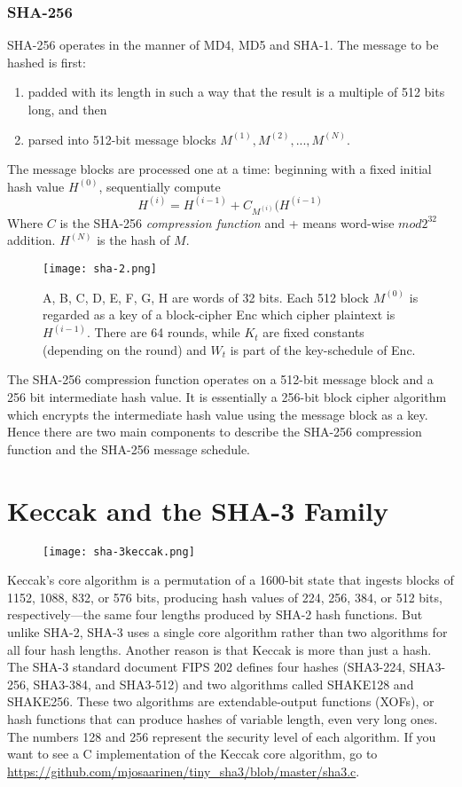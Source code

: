 \documentclass{article}
\begin{document}
\subsubsection{SHA-256}
\newline SHA-256 operates in the manner of MD4, MD5 and SHA-1. The message to be hashed is first:
\begin{enumerate}
    \item padded with its length in such a way that the result is a multiple of 512 bits long, and then
    \item parsed into 512-bit message blocks $M^{(1)}, M^{(2)}, ..., M^{(N)}$.
\end{enumerate}
The message blocks are processed one at a time: beginning with a fixed initial hash value $H^{(0)}$, sequentially compute
\begin{equation*}
    H^{(i)}=H^{(i-1)} + C_{M^{(i)}}(H^{(i-1)}
\end{equation*}
Where $C$ is the SHA-256 \textit{compression function} and + means word-wise $mod2^32$ addition. $H^{(N)}$ is the hash of $M$.
\begin{figure} [H]
    \centering
    \texttt{[image: sha-2.png]}
    \caption{A, B, C, D, E, F, G, H are words of 32 bits. Each 512 block $M^{(0)}$ is regarded as a key of a block-cipher Enc which cipher plaintext is $H^{(i-1)}$. There are 64 rounds, while $K_t$ are fixed constants (depending on the round) and $W_t$ is part of the key-schedule of Enc.}
\end{figure}
The SHA-256 compression function operates on a 512-bit message block and a 256 bit intermediate hash value. It is essentially a 256-bit block cipher algorithm which encrypts the intermediate hash value using the message block as a key. Hence there are two main components to describe the SHA-256 compression function and the SHA-256 message schedule. 
\section{Keccak and the SHA-3 Family}
\begin{figure} [H]
    \centering
    \texttt{[image: sha-3keccak.png]}
\end{figure}
Keccak’s core algorithm is a permutation of a 1600-bit state that ingests
blocks of 1152, 1088, 832, or 576 bits, producing hash values of 224, 256,
384, or 512 bits, respectively—the same four lengths produced by SHA-2 hash functions. But unlike SHA-2, SHA-3 uses a single core algorithm rather than two algorithms for all four hash lengths.
Another reason is that Keccak is more than just a hash. The SHA-3
standard document FIPS 202 defines four hashes (SHA3-224, SHA3-
256, SHA3-384, and SHA3-512) and two algorithms called SHAKE128
and SHAKE256. These two algorithms are extendable-output functions (XOFs), or hash functions that can produce hashes of variable length, even very
long ones. The numbers 128 and 256 represent the security level of each algorithm. If you want to see a C implementation of the Keccak core algorithm, go to \url{https://github.com/mjosaarinen/tiny_sha3/blob/master/sha3.c}.
\end{document}
